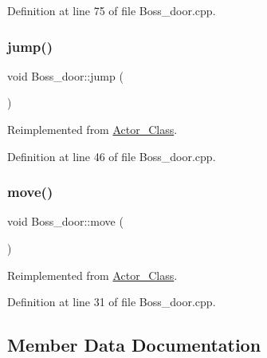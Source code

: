 Definition at line 75 of file Boss\+\_\+door.\+cpp.

\hypertarget{class_boss__door_ac2f0b88b5ca332380602f029f0f83e17}{}\label{class_boss__door_ac2f0b88b5ca332380602f029f0f83e17} 
\subsubsection{\texorpdfstring{jump()}{jump()}}
{\footnotesize\ttfamily void Boss\+\_\+door\+::jump (\begin{DoxyParamCaption}{ }\end{DoxyParamCaption})\hspace{0.3cm}{\ttfamily [virtual]}}



Reimplemented from \hyperlink{class_actor___class_ab33216a3ce0c856bdc16231c71ae35c2}{Actor\+\_\+\+Class}.



Definition at line 46 of file Boss\+\_\+door.\+cpp.

\hypertarget{class_boss__door_a27456c378555a03310cd4f25b167867c}{}\label{class_boss__door_a27456c378555a03310cd4f25b167867c} 
\subsubsection{\texorpdfstring{move()}{move()}}
{\footnotesize\ttfamily void Boss\+\_\+door\+::move (\begin{DoxyParamCaption}{ }\end{DoxyParamCaption})\hspace{0.3cm}{\ttfamily [virtual]}}



Reimplemented from \hyperlink{class_actor___class_af1764a94c5410ba8476f56553cd2c327}{Actor\+\_\+\+Class}.



Definition at line 31 of file Boss\+\_\+door.\+cpp.



\subsection{Member Data Documentation}
\hypertarget{class_boss__door_a78f03723848d84a1eae62fafa7933f92}{}\label{class_boss__door_a78f03723848d84a1eae62fafa7933f92} 
